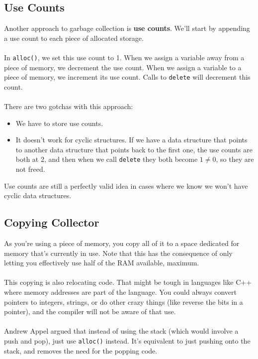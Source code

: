 \documentclass[]{article}
\theoremstyle{definition}
\begin{document}
		\subsection{Use Counts}
			Another approach to garbage collection is \textbf{use counts}. We'll start by appending a use count to each piece of allocated storage.
			\\ \\
			In \verb+alloc()+, we set this use count to 1. When we assign a variable away from a piece of memory, we decrement the use count. When we assign a variable to a piece of memory, we increment its use count. Calls to \verb+delete+ will decrement this count.
			\\ \\
			There are two gotchas with this approach:
			\begin{itemize}
				\item We have to store use counts.
				\item It doesn't work for cyclic structures. If we have a data structure that points to another data structure that points back to the first one, the use counts are both at 2, and then when we call \verb+delete+ they both become $1 \ne 0$, so they are not freed.
			\end{itemize}

			Use counts are still a perfectly valid idea in cases where we know we won't have cyclic data structures.

		\subsection{Copying Collector}
			As you're using a piece of memory, you copy all of it to a space dedicated for memory that's currently in use. Note that this has the consequence of only letting you effectively use half of the RAM available, maximum.
			\\ \\
			This copying is also relocating code. That might be tough in languages like C++ where memory addresses are part of the language. You could always convert pointers to integers, strings, or do other crazy things (like reverse the bits in a pointer), and the compiler will not be aware of that use.
			\\ \\
			Andrew Appel argued that instead of using the stack (which would involve a push and pop), just use \verb+alloc()+ instead. It's equivalent to just pushing onto the stack, and removes the need for the popping code.
			
\end{document}
